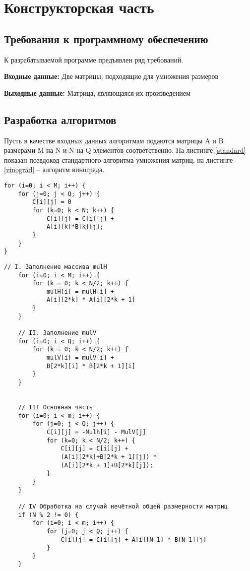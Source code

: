 \chapter{Конструкторская часть}

\section{Требования к программному обеспечению}

К разрабатываемой программе предъявлен ряд требований.

\textbf{Входные данные:} Две матрицы, подходящие для умножения размеров

\textbf{Выходные данные:} Матрица, являющаяся их произведением

\section{Разработка алгоритмов}
Пусть в качестве входных данных алгоритмам подаются  матрицы A и B размерами M на N и N на Q элементов соответственно. На листинге \ref{standard} показан псевдокод стандартного алгоритма умножения матриц, на листинге \ref{vinograd} – алгоритм винограда.

\begin{lstlisting}[label=standard, caption={Псевдокод стандартного алгоритма умножения}]
for (i=0; i < M; i++) {
	for (j=0; j < Q; j++) {
		C[i][j] = 0                  
		for (k=0; k < N; k++) {
			C[i][j] = C[i][j] +      
			A[i][k]*B[k][j];         
		}
	}
}

\end{lstlisting}

\begin{lstlisting}[label=vinograd, caption={Псевдокод алгоритма Винограда}]
	// I. Заполнение массива mulH
	for (i=0; i < M; i++) {
		for (k = 0; k < N/2; k++) {
			mulH[i] = mulH[i] +         
			A[i][2*k] * A[i][2*k + 1]   
		}
	}
	
	// II. Заполнение mulV
	for (i=0; i < Q; i++) {
		for (k = 0; k < N/2; k++) {
			mulV[i] = mulV[i] +         
			B[2*k][i] * B[2*k + 1][i]  
		}
	}
	
	
	// III Основная часть
	for (i=0; i < m; i++) {
		for (j=0; j < Q; j++) {
			C[i][j] = -Mulh[i] - MulV[j] 
			for (k=0; k < N/2; k++) {
				C[i][j] = C[i][j] +       
				(A[i][2*k]+B[2*k + 1][j]) *
				(A[i][2*k + 1]+B[2*k][j]);  
			}
		}
	}
	
	// IV Обработка на случай нечётной общей размерности матриц
	if (N % 2 != 0) {
		for (i=0; i < m; i++) {
			for (j=0; j < Q; j++) {
				C[i][j] = C[i][j] + A[i][N-1] * B[N-1][j]
			}
		}
	}
\end{lstlisting}

